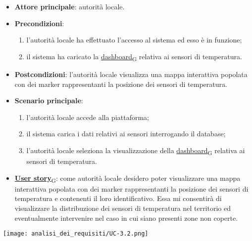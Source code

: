 \newpage

\begin{itemize}
	\item \textbf{Attore principale}: autorità locale.
	\item \textbf{Precondizioni}:
	      \begin{enumerate}
		      \item l'autorità locale ha effettuato l'accesso al sistema ed esso è in funzione;
		      \item il sistema ha caricato la \href{https://7last.github.io/docs/rtb/documentazione-interna/glossario\#dashboard}{dashboard\textsubscript{G}} relativa ai sensori di temperatura.
	      \end{enumerate}
	\item \textbf{Postcondizioni}: l'autorità locale visualizza una mappa interattiva popolata con dei marker rappresentanti la posizione dei sensori di temperatura.
	\item \textbf{Scenario principale}:
	      \begin{enumerate}
		      \item l'autorità locale accede alla piattaforma;
		      \item il sistema carica i dati relativi ai sensori interrogando il database;
		      \item l'autorità locale seleziona la visualizzazione della \href{https://7last.github.io/docs/rtb/documentazione-interna/glossario\#dashboard}{dashboard\textsubscript{G}} relativa ai sensori di temperatura.
	      \end{enumerate}
	\item \href{https://7last.github.io/docs/rtb/documentazione-interna/glossario\#user-story}{\textbf{User story}\textsubscript{G}}:
	      come autorità locale desidero poter visualizzare una mappa interattiva popolata con dei marker rappresentanti la posizione dei sensori di temperatura e contenenti il loro identificativo. Essa mi consentirà di visualizzare la distribuzione dei sensori di temperatura nel territorio ed eventualmente intervenire nel caso in cui siano presenti zone non coperte.
\end{itemize}
\begin{center}
	\texttt{[image: analisi\_dei\_requisiti/UC-3.2.png]}
\end{center}

